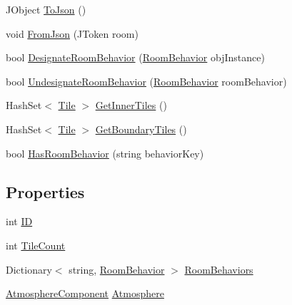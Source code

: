 \begin{DoxyCompactItemize}
\item 
J\+Object \hyperlink{class_project_porcupine_1_1_rooms_1_1_room_a6652748a954bc3db73a06513a29ce703}{To\+Json} ()
\item 
void \hyperlink{class_project_porcupine_1_1_rooms_1_1_room_a6fc719ad032aef8ebac5eeae738d7121}{From\+Json} (J\+Token room)
\item 
bool \hyperlink{class_project_porcupine_1_1_rooms_1_1_room_a6802b013fe3e6a6690b8d08f1e6fa0fb}{Designate\+Room\+Behavior} (\hyperlink{class_project_porcupine_1_1_rooms_1_1_room_behavior}{Room\+Behavior} obj\+Instance)
\item 
bool \hyperlink{class_project_porcupine_1_1_rooms_1_1_room_a0f765875c3588dfd4998d1b0ab13da86}{Undesignate\+Room\+Behavior} (\hyperlink{class_project_porcupine_1_1_rooms_1_1_room_behavior}{Room\+Behavior} room\+Behavior)
\item 
Hash\+Set$<$ \hyperlink{class_tile}{Tile} $>$ \hyperlink{class_project_porcupine_1_1_rooms_1_1_room_ac9dbe41f393f683ca4adcb31d0afae79}{Get\+Inner\+Tiles} ()
\item 
Hash\+Set$<$ \hyperlink{class_tile}{Tile} $>$ \hyperlink{class_project_porcupine_1_1_rooms_1_1_room_a0035382b8cd72579028f2f4e9180c9d0}{Get\+Boundary\+Tiles} ()
\item 
bool \hyperlink{class_project_porcupine_1_1_rooms_1_1_room_ae02dffee7fa78343b51c865aa4822139}{Has\+Room\+Behavior} (string behavior\+Key)
\end{DoxyCompactItemize}
\subsection*{Properties}
\begin{DoxyCompactItemize}
\item 
int \hyperlink{class_project_porcupine_1_1_rooms_1_1_room_a771baa5da19e53c1f481377a5efb616f}{ID}
\item 
int \hyperlink{class_project_porcupine_1_1_rooms_1_1_room_a4d750b1ce000b76f5bfbc46089477668}{Tile\+Count}
\item 
Dictionary$<$ string, \hyperlink{class_project_porcupine_1_1_rooms_1_1_room_behavior}{Room\+Behavior} $>$ \hyperlink{class_project_porcupine_1_1_rooms_1_1_room_a7fea258cc166ddf35c623e32d6b28a4a}{Room\+Behaviors}
\item 
\hyperlink{class_atmosphere_component}{Atmosphere\+Component} \hyperlink{class_project_porcupine_1_1_rooms_1_1_room_a3f5dc5ce59c3676d4ce5f4272df29b9b}{Atmosphere}
\end{DoxyCompactItemize}


